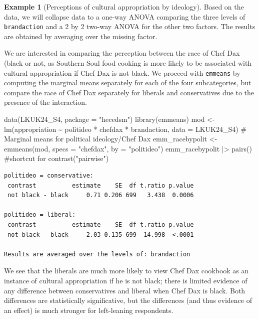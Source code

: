 \documentclass[
  11pt,
  letterpaper,
]{scrbook}
\newenvironment{Shaded}{\begin{snugshade}}{\end{snugshade}}
\newcommand{\AttributeTok}[1]{\textcolor[rgb]{0.40,0.45,0.13}{#1}}
\newcommand{\CommentTok}[1]{\textcolor[rgb]{0.37,0.37,0.37}{#1}}
\newcommand{\FunctionTok}[1]{\textcolor[rgb]{0.28,0.35,0.67}{#1}}
\newcommand{\NormalTok}[1]{\textcolor[rgb]{0.00,0.23,0.31}{#1}}
\newcommand{\OtherTok}[1]{\textcolor[rgb]{0.00,0.23,0.31}{#1}}
\newcommand{\SpecialCharTok}[1]{\textcolor[rgb]{0.37,0.37,0.37}{#1}}
\newcommand{\StringTok}[1]{\textcolor[rgb]{0.13,0.47,0.30}{#1}}
\theoremstyle{definition}
\theoremstyle{definition}
\newtheorem{example}{Example}[chapter]
\theoremstyle{remark}
\begin{document}
\begin{example}[Perceptions of cultural appropriation by
ideology]
Based on the data, we will collapse data to a one-way ANOVA comparing
the three levels of \texttt{brandaction} and a 2 by 2 two-way ANOVA for
the other two factors. The results are obtained by averaging over the
missing factor.

We are interested in comparing the perception between the race of Chef
Dax (black or not, as Southern Soul food cooking is more likely to be
associated with cultural appropriation if Chef Dax is not black. We
proceed with \texttt{emmeans} by computing the marginal means separately
for each of the four subcategories, but compare the race of Chef Dax
separately for liberals and conservatives due to the presence of the
interaction.

\begin{Shaded}
\begin{Highlighting}[]
\FunctionTok{data}\NormalTok{(LKUK24\_S4, }\AttributeTok{package =} \StringTok{"hecedsm"}\NormalTok{)}
\FunctionTok{library}\NormalTok{(emmeans)}
\NormalTok{mod }\OtherTok{\textless{}{-}} \FunctionTok{lm}\NormalTok{(appropriation }\SpecialCharTok{\textasciitilde{}}\NormalTok{ politideo }\SpecialCharTok{*}\NormalTok{ chefdax }\SpecialCharTok{*}\NormalTok{ brandaction,}
   \AttributeTok{data =}\NormalTok{ LKUK24\_S4)}
\CommentTok{\# Marginal means for political ideology/Chef Dax}
\NormalTok{emm\_racebypolit }\OtherTok{\textless{}{-}} \FunctionTok{emmeans}\NormalTok{(mod, }\AttributeTok{specs =} \StringTok{"chefdax"}\NormalTok{, }\AttributeTok{by =} \StringTok{"politideo"}\NormalTok{)}
\NormalTok{emm\_racebypolit }\SpecialCharTok{|\textgreater{}} \FunctionTok{pairs}\NormalTok{() }\CommentTok{\#shortcut for contrast("pairwise")}
\end{Highlighting}
\end{Shaded}

\begin{verbatim}
politideo = conservative:
 contrast          estimate    SE  df t.ratio p.value
 not black - black     0.71 0.206 699   3.438  0.0006

politideo = liberal:
 contrast          estimate    SE  df t.ratio p.value
 not black - black     2.03 0.135 699  14.998  <.0001

Results are averaged over the levels of: brandaction 
\end{verbatim}

We see that the liberals are much more likely to view Chef Dax cookbook
as an instance of cultural appropriation if he is not black; there is
limited evidence of any difference between conservatives and liberal
when Chef Dax is black. Both differences are statistically
significative, but the differences (and thus evidence of an effect) is
much stronger for left-leaning respondents.


\end{example}
\end{document}
